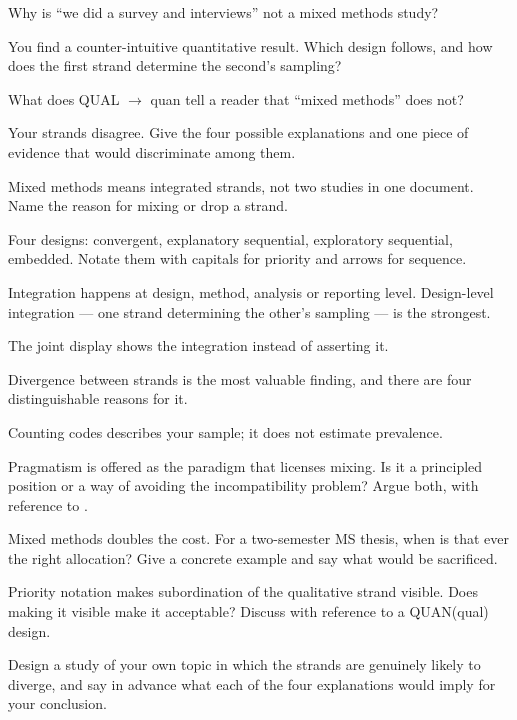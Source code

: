\begin{checkpoint}
\begin{tightnum}
  \item Why is ``we did a survey and interviews'' not a mixed methods study?
  \item You find a counter-intuitive quantitative result. Which design follows,
    and how does the first strand determine the second's sampling?
  \item What does QUAL $\rightarrow$ quan tell a reader that ``mixed methods''
    does not?
  \item Your strands disagree. Give the four possible explanations and one
    piece of evidence that would discriminate among them.
\end{tightnum}
\end{checkpoint}

\begin{chaptersummary}
\begin{tight}
  \item Mixed methods means integrated strands, not two studies in one
    document. Name the reason for mixing or drop a strand.
  \item Four designs: convergent, explanatory sequential, exploratory
    sequential, embedded. Notate them with capitals for priority and arrows for
    sequence.
  \item Integration happens at design, method, analysis or reporting level.
    Design-level integration --- one strand determining the other's sampling
    --- is the strongest.
  \item The joint display shows the integration instead of asserting it.
  \item Divergence between strands is the most valuable finding, and there are
    four distinguishable reasons for it.
  \item Counting codes describes your sample; it does not estimate prevalence.
\end{tight}
\end{chaptersummary}

\begin{reviewq}
  \item Pragmatism is offered as the paradigm that licenses mixing. Is it a
    principled position or a way of avoiding the incompatibility problem?
    Argue both, with reference to .
  \item Mixed methods doubles the cost. For a two-semester MS thesis, when is
    that ever the right allocation? Give a concrete example and say what would
    be sacrificed.
  \item Priority notation makes subordination of the qualitative strand
    visible. Does making it visible make it acceptable? Discuss with reference
    to a QUAN(qual) design.
  \item Design a study of your own topic in which the strands are genuinely
    likely to diverge, and say in advance what each of the four explanations
    would imply for your conclusion.
\end{reviewq}
